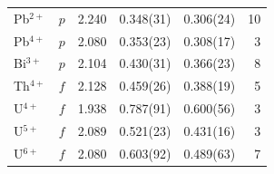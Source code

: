 \begin{longtable}{l l r r r r}
  Pb$^{2+}$            & $p$   & 2.240 &      0.348(31) &      0.306(24) & 10 \\
  Pb$^{4+}$            & $p$   & 2.080 &      0.353(23) &      0.308(17) & 3 \\
  Bi$^{3+}$            & $p$   & 2.104 &      0.430(31) &      0.366(23) & 8 \\
  Th$^{4+}$            & $f$   & 2.128 &      0.459(26) &      0.388(19) & 5 \\
  U$^{4+}$             & $f$   & 1.938 &      0.787(91) &      0.600(56) & 3 \\
  U$^{5+}$             & $f$   & 2.089 &      0.521(23) &      0.431(16) & 3 \\
  U$^{6+}$             & $f$   & 2.080 &      0.603(92) &      0.489(63) & 7 \\
\end{longtable}
